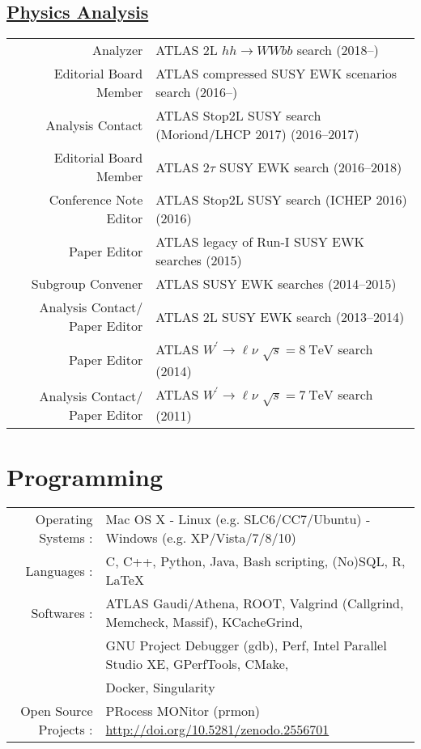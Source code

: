 \documentclass[a4paper,10pt]{article}
\begin{document}
\subsection{\underline{Physics Analysis}}
\begin{tabular}{r | p{12.5cm}}
\multicolumn{1}{r|}{Analyzer}					& ATLAS 2L $hh\rightarrow WWbb$ search \hfill (2018--\phantom{0000})					\\
\multicolumn{1}{r|}{Editorial Board Member}		& ATLAS compressed SUSY EWK scenarios search \hfill (2016--\phantom{0000})			\\
\multicolumn{1}{r|}{Analysis Contact}				& ATLAS Stop2L SUSY search (Moriond/LHCP 2017)  \hfill (2016--2017)					\\
\multicolumn{1}{r|}{Editorial Board Member}		& ATLAS 2$\tau$ SUSY EWK search \hfill (2016--2018)								\\
\multicolumn{1}{r|}{Conference Note Editor}		& ATLAS Stop2L SUSY search (ICHEP 2016) \hfill (2016)								\\
\multicolumn{1}{r|}{Paper Editor}				& ATLAS legacy of Run-I SUSY EWK searches \hfill (2015) 							\\ 
\multicolumn{1}{r|}{Subgroup Convener}			& ATLAS SUSY EWK searches \hfill (2014--2015)									\\
\multicolumn{1}{r|}{Analysis Contact/ Paper Editor}	& ATLAS 2L SUSY EWK search \hfill (2013--2014)									\\
\multicolumn{1}{r|}{Paper Editor}				& ATLAS $W^{\prime}\rightarrow\ell\nu$ $\sqrt{s} = 8\ \mathrm{TeV}$  search \hfill (2014)		\\
\multicolumn{1}{r|}{Analysis Contact/ Paper Editor}	& ATLAS $W^{\prime}\rightarrow\ell\nu$ $\sqrt{s} = 7\ \mathrm{TeV}$ search \hfill (2011)		\\
\end{tabular}

\section{Programming}
\begin{tabular}{rl}
Operating Systems : 		& Mac OS X - Linux (e.g. SLC6/CC7/Ubuntu) - Windows (e.g. XP/Vista/7/8/10) 	\\
Languages : 			& C, C++, Python, Java, Bash scripting, (No)SQL, R, \LaTeX				\\
Softwares : 			& ATLAS Gaudi/Athena, ROOT, Valgrind (Callgrind, Memcheck, Massif), KCacheGrind, \\ 
					& GNU Project Debugger (gdb), Perf, Intel\textsuperscript{\textregistered} Parallel Studio XE, GPerfTools, CMake, \\
					& Docker, Singularity \\
Open Source Projects : 	& PRocess MONitor (prmon) \href{http://doi.org/10.5281/zenodo.2556701}{http://doi.org/10.5281/zenodo.2556701}
\end{tabular}
\end{document}
